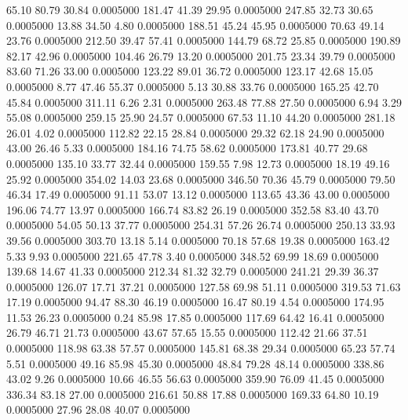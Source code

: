   65.10   80.79   30.84   0.0005000
 181.47   41.39   29.95   0.0005000
 247.85   32.73   30.65   0.0005000
  13.88   34.50    4.80   0.0005000
 188.51   45.24   45.95   0.0005000
  70.63   49.14   23.76   0.0005000
 212.50   39.47   57.41   0.0005000
 144.79   68.72   25.85   0.0005000
 190.89   82.17   42.96   0.0005000
 104.46   26.79   13.20   0.0005000
 201.75   23.34   39.79   0.0005000
  83.60   71.26   33.00   0.0005000
 123.22   89.01   36.72   0.0005000
 123.17   42.68   15.05   0.0005000
   8.77   47.46   55.37   0.0005000
   5.13   30.88   33.76   0.0005000
 165.25   42.70   45.84   0.0005000
 311.11    6.26    2.31   0.0005000
 263.48   77.88   27.50   0.0005000
   6.94    3.29   55.08   0.0005000
 259.15   25.90   24.57   0.0005000
  67.53   11.10   44.20   0.0005000
 281.18   26.01    4.02   0.0005000
 112.82   22.15   28.84   0.0005000
  29.32   62.18   24.90   0.0005000
  43.00   26.46    5.33   0.0005000
 184.16   74.75   58.62   0.0005000
 173.81   40.77   29.68   0.0005000
 135.10   33.77   32.44   0.0005000
 159.55    7.98   12.73   0.0005000
  18.19   49.16   25.92   0.0005000
 354.02   14.03   23.68   0.0005000
 346.50   70.36   45.79   0.0005000
  79.50   46.34   17.49   0.0005000
  91.11   53.07   13.12   0.0005000
 113.65   43.36   43.00   0.0005000
 196.06   74.77   13.97   0.0005000
 166.74   83.82   26.19   0.0005000
 352.58   83.40   43.70   0.0005000
  54.05   50.13   37.77   0.0005000
 254.31   57.26   26.74   0.0005000
 250.13   33.93   39.56   0.0005000
 303.70   13.18    5.14   0.0005000
  70.18   57.68   19.38   0.0005000
 163.42    5.33    9.93   0.0005000
 221.65   47.78    3.40   0.0005000
 348.52   69.99   18.69   0.0005000
 139.68   14.67   41.33   0.0005000
 212.34   81.32   32.79   0.0005000
 241.21   29.39   36.37   0.0005000
 126.07   17.71   37.21   0.0005000
 127.58   69.98   51.11   0.0005000
 319.53   71.63   17.19   0.0005000
  94.47   88.30   46.19   0.0005000
  16.47   80.19    4.54   0.0005000
 174.95   11.53   26.23   0.0005000
   0.24   85.98   17.85   0.0005000
 117.69   64.42   16.41   0.0005000
  26.79   46.71   21.73   0.0005000
  43.67   57.65   15.55   0.0005000
 112.42   21.66   37.51   0.0005000
 118.98   63.38   57.57   0.0005000
 145.81   68.38   29.34   0.0005000
  65.23   57.74    5.51   0.0005000
  49.16   85.98   45.30   0.0005000
  48.84   79.28   48.14   0.0005000
 338.86   43.02    9.26   0.0005000
  10.66   46.55   56.63   0.0005000
 359.90   76.09   41.45   0.0005000
 336.34   83.18   27.00   0.0005000
 216.61   50.88   17.88   0.0005000
 169.33   64.80   10.19   0.0005000
  27.96   28.08   40.07   0.0005000
